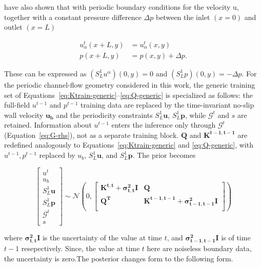 \documentclass[11pt, a4paper]{report}
\begin{document}
\textcite{Molina2023} have also shown that with periodic boundary conditions for the velocity u, together with a constant
pressure difference \(\Delta p\) between the inlet \( (x=0) \) and outlet \( (x=L) \)

\begin{align}
    u^t_\alpha(x+L,y) &= u^t_\alpha(x,y) \\
    p(x+L,y) &= p(x,y) + \Delta p.
\end{align}

\vspace{0.3cm}
\noindent These can be expressed as \((S^1_{L} u^{\alpha})(0,y) = 0\) and \((S^1_{L} p)(0,y) = -\Delta p.\)
For the periodic channel-flow geometry considered in this work, the generic training
set of Equations~\eqref{eq:Ktrain-generic}--\eqref{eq:Q-generic} is specialized as
follows: the full-field \(u^{t-1}\) and \(p^{t-1}\) training data are replaced by the
time-invariant no-slip wall velocity \(\boldsymbol{u_b}\) and the periodicity
constraints \(S^1_L\boldsymbol{u}\), \(S^1_L\boldsymbol{p}\), while \(\mathcal{G}^t\) and
\(s\) are retained. Information about \(u^{t-1}\) enters the inference only through
\(\mathcal{G}^t\) (Equation~\eqref{eq:G-rhs}), not as a separate training block.
\(\boldsymbol{Q}\) and \(\boldsymbol{K^{t-1,t-1}}\) are redefined analogously to
Equations~\eqref{eq:Ktrain-generic} and \eqref{eq:Q-generic}, with \(u^{t-1}, p^{t-1}\)
replaced by \(u_b\), \(S^1_L\boldsymbol{u}\), and \(S^1_L\boldsymbol{p}\). The prior
becomes

\begin{equation}
    \begin{bmatrix}
        u^{t} \\
        u_b\\
        S^1_{L} \boldsymbol{u} \\
        S^1_{L} \boldsymbol{p} \\
        \mathcal{G}^{t} \\
        s
    \end{bmatrix}
    \sim\mathcal{N}\left(0,
    \begin{bmatrix}
        \boldsymbol{K^{t, t} + \sigma_{t,t}^2 I} & \boldsymbol{Q}\\
        \boldsymbol{Q^T} & \boldsymbol{K^{t-1, t-1}+ \sigma_{t-1,t-1}^2 I} \\
    \end{bmatrix}
    \right)
\end{equation}

\noindent where \(\boldsymbol{\sigma_{t,t}^2 I}\) is the uncertainty of the value at time \(t\), and 
\(\boldsymbol{\sigma_{t-1,t-1}^2 I}\) is of time \(t-1\) resepectively. Since, the value at time \(t\)
here are noiseless boundary data, the uncertainty is zero.The posterior changes form to the following form.
\end{document}
